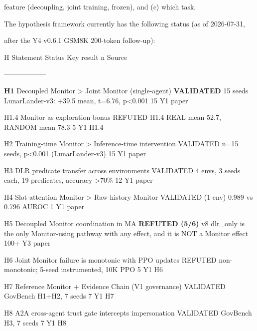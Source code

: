 \documentclass[
]{article}
\begin{document}
feature (decoupling, joint training, frozen), and (c) which task.

The hypothesis framework currently has the following status (as of
2026-07-31,

after the Y4 v0.6.1 GSM8K 200-token follow-up):

H \textbar{} Statement \textbar{} Status \textbar{} Key result
\textbar{} n \textbar{} Source \textbar{}

\textbar---\textbar---\textbar---\textbar---\textbar---\textbar---\textbar{}

\textbf{H1} \textbar{} Decoupled Monitor \textgreater{} Joint Monitor
(single-agent) \textbar{} \textbf{VALIDATED} \textbar{} 15 seeds
LunarLander-v3: +39.5 mean, t=6.76, p\textless0.001 \textbar{} 15
\textbar{} Y1 paper \textbar{}

H1.4 \textbar{} Monitor as exploration bonus \textbar{} REFUTED
\textbar{} H1.4 REAL mean 52.7, RANDOM mean 78.3 \textbar{} 5 \textbar{}
Y1 H1.4 \textbar{}

H2 \textbar{} Training-time Monitor \textgreater{} Inference-time
intervention \textbar{} VALIDATED \textbar{} n=15 seeds, p\textless0.001
(LunarLander-v3) \textbar{} 15 \textbar{} Y1 paper \textbar{}

H3 \textbar{} DLR predicate transfer across environments \textbar{}
VALIDATED \textbar{} 4 envs, 3 seeds each, 19 predicates, accuracy
\textgreater70\% \textbar{} 12 \textbar{} Y1 paper \textbar{}

H4 \textbar{} Slot-attention Monitor \textgreater{} Raw-history Monitor
\textbar{} VALIDATED (1 env) \textbar{} 0.989 vs 0.796 AUROC \textbar{}
1 \textbar{} Y1 paper \textbar{}

H5 \textbar{} Decoupled Monitor coordination in MA \textbar{}
\textbf{REFUTED (5/6)} \textbar{} v8 dlr\_only is the only Monitor-using
pathway with any effect, and it is NOT a Monitor effect \textbar{} 100+
\textbar{} Y3 paper \textbar{}

H6 \textbar{} Joint Monitor failure is monotonic with PPO updates
\textbar{} REFUTED \textbar{} non-monotonic; 5-seed instrumented, 10K
PPO \textbar{} 5 \textbar{} Y1 H6 \textbar{}

H7 \textbar{} Reference Monitor + Evidence Chain (V1 governance)
\textbar{} VALIDATED \textbar{} GovBench H1+H2, 7 seeds \textbar{} 7
\textbar{} Y1 H7 \textbar{}

H8 \textbar{} A2A cross-agent trust gate intercepts impersonation
\textbar{} VALIDATED \textbar{} GovBench H3, 7 seeds \textbar{} 7
\textbar{} Y1 H8 \textbar{}
\end{document}

